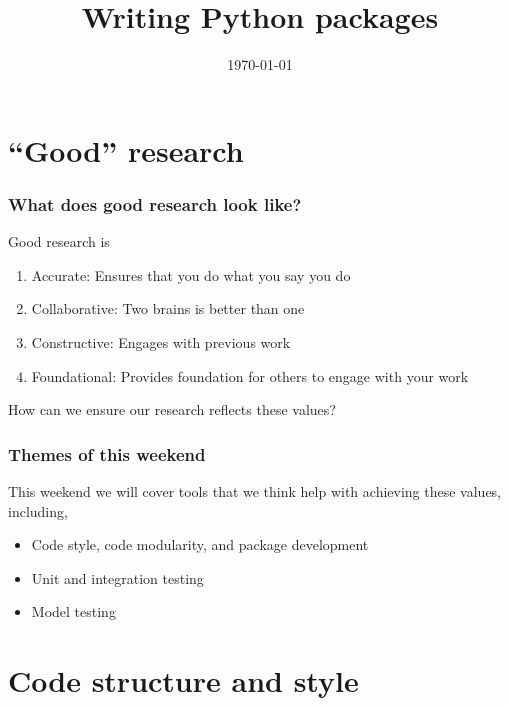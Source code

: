 \documentclass[10pt]{beamer}
\title{Writing Python packages}
\date[]{\today}
\begin{document}
\begin{frame}
  \titlepage
\end{frame}

\section{``Good'' research}

  \begin{frame} \frametitle{What does good research look like?}

    Good research is

    \begin{enumerate}
      \item<2-> Accurate: Ensures that you do what you say you do
      \item<3-> Collaborative: Two brains is better than one
      \item<4-> Constructive: Engages with previous work
      \item<5-> Foundational: Provides foundation for others to engage with your work
    \end{enumerate}

    How can we ensure our research reflects these values?

  \end{frame}

  \begin{frame} \frametitle{Themes of this weekend}

    This weekend we will cover tools that we think help with achieving these values, including,

    \begin{itemize}
      \item Code style, code modularity, and package development
      \item Unit and integration testing
      \item Model testing
    \end{itemize}

  \end{frame}


\section{Code structure and style}
\end{document}
